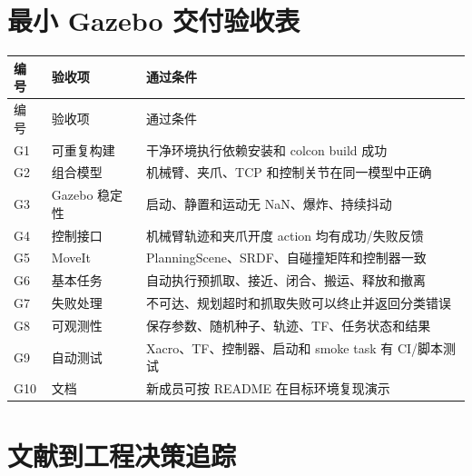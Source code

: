\documentclass[UTF8,12pt,oneside]{ctexrep}
\begin{document}
\appendix
\chapter{最小 Gazebo 交付验收表}

\begin{longtable}{L{1.2cm}L{5.5cm}L{7.9cm}}
\toprule
编号 & 验收项 & 通过条件 \\
\midrule
\endfirsthead
\toprule
编号 & 验收项 & 通过条件 \\
\midrule
\endhead
G1 & 可重复构建 & 干净环境执行依赖安装和 colcon build 成功 \\
G2 & 组合模型 & 机械臂、夹爪、TCP 和控制关节在同一模型中正确 \\
G3 & Gazebo 稳定性 & 启动、静置和运动无 NaN、爆炸、持续抖动 \\
G4 & 控制接口 & 机械臂轨迹和夹爪开度 action 均有成功/失败反馈 \\
G5 & MoveIt & PlanningScene、SRDF、自碰撞矩阵和控制器一致 \\
G6 & 基本任务 & 自动执行预抓取、接近、闭合、搬运、释放和撤离 \\
G7 & 失败处理 & 不可达、规划超时和抓取失败可以终止并返回分类错误 \\
G8 & 可观测性 & 保存参数、随机种子、轨迹、TF、任务状态和结果 \\
G9 & 自动测试 & Xacro、TF、控制器、启动和 smoke task 有 CI/脚本测试 \\
G10 & 文档 & 新成员可按 README 在目标环境复现演示 \\
\bottomrule
\end{longtable}

\chapter{文献到工程决策追踪}
\end{document}
